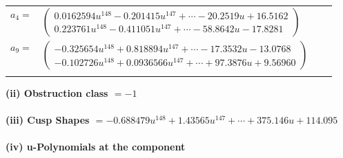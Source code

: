 \documentclass[1p]{elsarticle_modified}
\theoremstyle{definition}
\begin{document}
\begin{tabular}{m{7pt} m{180pt} m{7pt} m{180pt} }
\flushright $a_{4}=$&$\begin{pmatrix}0.0162594 u^{148}-0.201415 u^{147}+\cdots-20.2519 u+16.5162\\0.223761 u^{148}-0.411051 u^{147}+\cdots-58.8642 u-17.8281\end{pmatrix}$ \\
\flushright $a_{9}=$&$\begin{pmatrix}-0.325654 u^{148}+0.818894 u^{147}+\cdots-17.3532 u-13.0768\\-0.102726 u^{148}+0.0936566 u^{147}+\cdots+97.3876 u+9.56960\end{pmatrix}$\\&\end{tabular}
\flushleft \textbf{(ii) Obstruction class $= -1$}\\~\\
\flushleft \textbf{(iii) Cusp Shapes $= -0.688479 u^{148}+1.43565 u^{147}+\cdots+375.146 u+114.095$}\\~\\
\newpage\renewcommand{\arraystretch}{1}
\flushleft \textbf{(iv) u-Polynomials at the component}\newline \\
\end{document}
